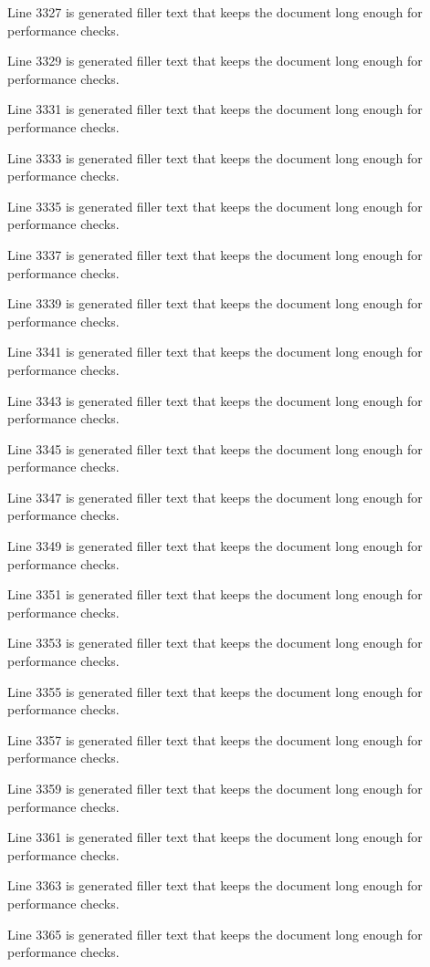 Line 3327 is generated filler text that keeps the document long enough for performance checks.

Line 3329 is generated filler text that keeps the document long enough for performance checks.

Line 3331 is generated filler text that keeps the document long enough for performance checks.

Line 3333 is generated filler text that keeps the document long enough for performance checks.

Line 3335 is generated filler text that keeps the document long enough for performance checks.

Line 3337 is generated filler text that keeps the document long enough for performance checks.

Line 3339 is generated filler text that keeps the document long enough for performance checks.

Line 3341 is generated filler text that keeps the document long enough for performance checks.

Line 3343 is generated filler text that keeps the document long enough for performance checks.

Line 3345 is generated filler text that keeps the document long enough for performance checks.

Line 3347 is generated filler text that keeps the document long enough for performance checks.

Line 3349 is generated filler text that keeps the document long enough for performance checks.

Line 3351 is generated filler text that keeps the document long enough for performance checks.

Line 3353 is generated filler text that keeps the document long enough for performance checks.

Line 3355 is generated filler text that keeps the document long enough for performance checks.

Line 3357 is generated filler text that keeps the document long enough for performance checks.

Line 3359 is generated filler text that keeps the document long enough for performance checks.

Line 3361 is generated filler text that keeps the document long enough for performance checks.

Line 3363 is generated filler text that keeps the document long enough for performance checks.

Line 3365 is generated filler text that keeps the document long enough for performance checks.

